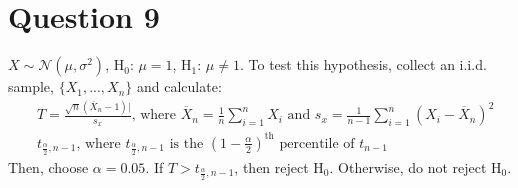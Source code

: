 \documentclass{article}
\newcommand{\N}{\mathcal{N}}
\newcommand{\olx}[1]{\overline{X}_{#1}}
\newcommand{\est}[1]{\frac{1}{#1}\sum_{i=1}^{#1}}
\begin{document}

\section*{Question 9}
$X\sim\N(\mu,\sigma^2)$, H$_0$: $\mu=1$, H$_1$: $\mu\neq 1$. To test this hypothesis, collect an i.i.d. sample, $\{X_1,...,X_n\}$ and calculate:
\begin{align*}
	&T = \frac{\sqrt{n}(\olx{n}-1)|}{s_x}\text{, where } \olx{n}=\est{n}X_i\text{ and } s_x=\frac{1}{n-1}\sum_{i=1}^n(X_i-\olx{n})^2 \\
	&t_{\frac{\alpha}{2},n-1}\text{, where } t_{\frac{\alpha}{2},n-1} \text{ is the }\left(1-\frac{\alpha}{2}\right)^{\text{th}}\text{ percentile of }t_{n-1}
\end{align*}
Then, choose $\alpha = 0.05$. If $T>t_{\frac{\alpha}{2},n-1}$, then reject H$_0$. Otherwise, do not reject H$_0$.

\end{document}
